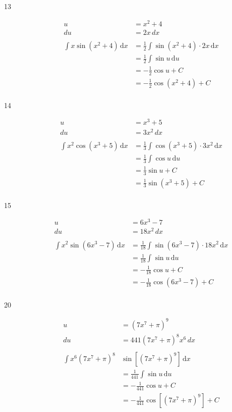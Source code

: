 \documentclass{exam}
\begin{document}
\begin{description}
\item[13]
\begin{align*}
  u &= x^2 + 4 \\
  du &= 2x \, dx \\
\\
  \int x \sin(x^2 + 4) \, \mathrm{d}x &= \frac{1}{2} \int \sin(x^2 + 4) \cdot 2x \, \mathrm{d}x \\
  &= \frac{1}{2} \int \sin u \, \mathrm{d}u \\
  &= - \frac{1}{2} \cos u + C \\
  &= - \frac{1}{2} \cos (x^2 + 4) + C \\
\end{align*}

\item[14]
\begin{align*}
  u &= x^3 + 5 \\
  du &= 3x^2 \, dx \\
\\
  \int x^2 \cos(x^3 + 5) \, \mathrm{d}x &= \frac{1}{3} \int \cos(x^3 + 5) \cdot 3x^2 \, \mathrm{d}x \\
  &= \frac{1}{3} \int \cos u \, \mathrm{d}u \\
  &= \frac{1}{3} \sin u + C \\
  &= \frac{1}{3} \sin (x^3 + 5) + C \\
\end{align*}

\item[15]
\begin{align*}
  u &= 6x^3 - 7 \\
  du &= 18x^2 \, dx \\
\\
  \int x^2 \sin(6x^3 - 7) \, \mathrm{d}x &= \frac{1}{18} \int \sin(6x^3 - 7) \cdot 18x^2 \, \mathrm{d}x \\
  &= \frac{1}{18} \int \sin u \, \mathrm{d}u \\
  &= -\frac{1}{18} \cos u + C \\
  &= -\frac{1}{18} \cos (6x^3 - 7) + C \\
\end{align*}

\item[20]
\begin{align*}
  u &= (7x^7 + \pi)^9 \\
  du &= 441 (7x^7 + \pi)^8 x^6 \, dx \\
\\
  \int x^6 (7x^7 + \pi)^8 &\sin[ (7x^7 + \pi)^9 ] \, \mathrm{d}x \\
  &= \frac{1}{441} \int \sin u \, \mathrm{d}u \\
  &= -\frac{1}{441} \cos u + C \\
  &= -\frac{1}{441} \cos [ (7x^7 + \pi)^9 ] + C \\
\end{align*}


\end{description}
\end{document}
